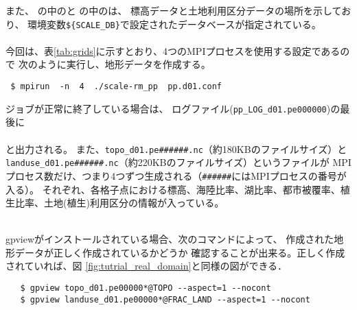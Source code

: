 また、
の中のと
の中のは、
標高データと土地利用区分データの場所を示しており、
環境変数\verb|${SCALE_DB}|で設定されたデータベースが指定されている。\\

\\


今回は、表\ref{tab:grids}に示すとおり、4つのMPIプロセスを使用する設定であるので
次のように実行し、地形データを作成する。
\begin{verbatim}
 $ mpirun  -n  4  ./scale-rm_pp  pp.d01.conf
\end{verbatim}
ジョブが正常に終了している場合は、
ログファイル(\verb|pp_LOG_d01.pe000000|)の最後に\\

\\

\noindent
と出力される。
また、\verb|topo_d01.pe######.nc|（約180KBのファイルサイズ）と\\
\verb|landuse_d01.pe######.nc|（約220KBのファイルサイズ）というファイルが
MPIプロセス数だけ、つまり4つずつ生成される（\verb|######|にはMPIプロセスの番号が入る）。
それぞれ、各格子点における標高、海陸比率、湖比率、都市被覆率、植生比率、土地(植生)利用区分の情報が入っている。


 \vspace{1cm}
  \hrulefill \\
 gpviewがインストールされている場合、次のコマンドによって、
 作成された地形データが正しく作成されているかどうか
 確認することが出来る。正しく作成されていれば、図 \ref{fig:tutrial_real_domain}と同様の図ができる．
 \begin{verbatim}
   $ gpview topo_d01.pe00000*@TOPO --aspect=1 --nocont
   $ gpview landuse_d01.pe00000*@FRAC_LAND --aspect=1 --nocont
 \end{verbatim}

